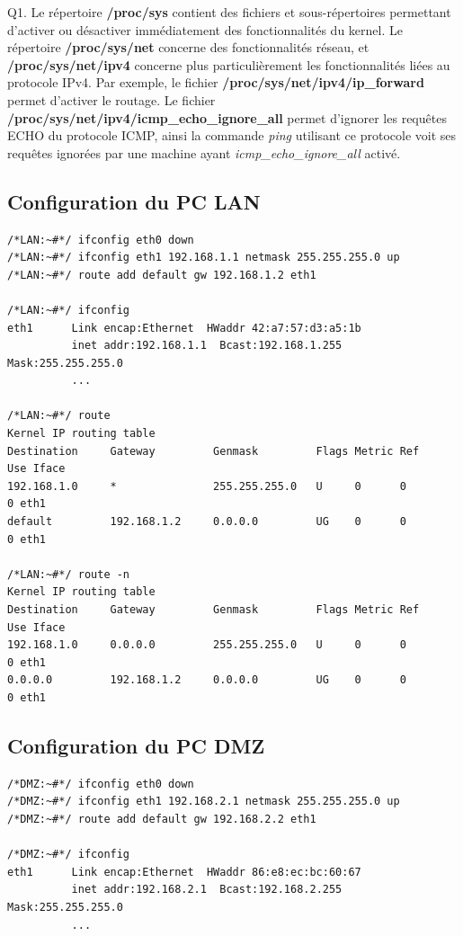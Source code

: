 \documentclass[frenchb, 11pt]{article}
\newlength{\leftbarwidth}
\newlength{\leftbarsep}
\newcommand*{\leftbarcolorcmd}{\color{leftbarcolor}} %
\renewenvironment{leftbar}{%
    \def\FrameCommand{{\leftbarcolorcmd{\vrule width \leftbarwidth\relax\hspace {\leftbarsep}}}}%
    \MakeFramed {\advance \hsize -\width \FrameRestore }%
}{%
    \endMakeFramed
}
\begin{document}
\begin{leftbar}
\noindent Q1. Le répertoire \textbf{/proc/sys} contient des fichiers et sous-répertoires permettant d'activer ou désactiver immédiatement des fonctionnalités du kernel. Le répertoire \textbf{/proc/sys/net} concerne des fonctionnalités réseau, et \textbf{/proc/sys/net/ipv4} concerne plus particulièrement les fonctionnalités liées au protocole IPv4. Par exemple, le fichier \textbf{/proc/sys/net/ipv4/ip\_forward} permet d'activer le routage. Le fichier \textbf{/proc/sys/net/ipv4/icmp\_echo\_ignore\_all} permet d'ignorer les requêtes ECHO du protocole ICMP, ainsi la commande \emph{ping} utilisant ce protocole voit ses requêtes ignorées par une machine ayant \emph{icmp\_echo\_ignore\_all} activé.
\end{leftbar}

\subsection{Configuration du PC LAN}
\begin{lstlisting}
/*LAN:~#*/ ifconfig eth0 down
/*LAN:~#*/ ifconfig eth1 192.168.1.1 netmask 255.255.255.0 up
/*LAN:~#*/ route add default gw 192.168.1.2 eth1

/*LAN:~#*/ ifconfig
eth1      Link encap:Ethernet  HWaddr 42:a7:57:d3:a5:1b
          inet addr:192.168.1.1  Bcast:192.168.1.255  Mask:255.255.255.0
          ...

/*LAN:~#*/ route
Kernel IP routing table
Destination     Gateway         Genmask         Flags Metric Ref    Use Iface
192.168.1.0     *               255.255.255.0   U     0      0        0 eth1
default         192.168.1.2     0.0.0.0         UG    0      0        0 eth1

/*LAN:~#*/ route -n
Kernel IP routing table
Destination     Gateway         Genmask         Flags Metric Ref    Use Iface
192.168.1.0     0.0.0.0         255.255.255.0   U     0      0        0 eth1
0.0.0.0         192.168.1.2     0.0.0.0         UG    0      0        0 eth1
\end{lstlisting}

\subsection{Configuration du PC DMZ}
\begin{lstlisting}
/*DMZ:~#*/ ifconfig eth0 down
/*DMZ:~#*/ ifconfig eth1 192.168.2.1 netmask 255.255.255.0 up
/*DMZ:~#*/ route add default gw 192.168.2.2 eth1

/*DMZ:~#*/ ifconfig
eth1      Link encap:Ethernet  HWaddr 86:e8:ec:bc:60:67
          inet addr:192.168.2.1  Bcast:192.168.2.255  Mask:255.255.255.0
          ...
\end{lstlisting}
\newpage
\end{document}
